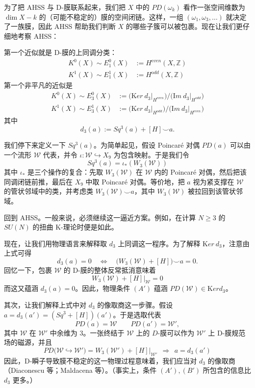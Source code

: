 \documentclass[11pt,a4paper]{ctexart}
\begin{document}
为了把 AHSS 与 D-膜联系起来，我们把 \(X\) 中的 \(PD(\omega_k)\) 看作一张空间维数为 \(\dim X - k\) 的（可能不稳定的）膜的空间闭链。这样，一组 \((\omega_1, \omega_3, \dots)\) 就决定了一族膜，因此 AHSS 帮助我们判断 \(X\) 的哪些子簇可以被包裹。现在让我们更仔细地考察 AHSS：

第一个近似就是 D-膜的上同调分类： \[\begin{matrix}
K^0(X) \sim   E^0_1(X) & :=   H^{\mathrm even}(X,\mathbb{Z}) \\
K^1(X) \sim  E^1_1(X) & :=  H^{ \mathrm odd}(X,\mathbb{Z})
\end{matrix}\] 第一个非平凡的近似是 \[\begin{matrix}
K^0(X) \sim E^0_3(X) &  := \bigl( {\mathrm Ker} ~d_3\vert_{H^{\mathrm even} }\bigr) / \bigl({\mathrm Im} ~d_3\vert_{H^{\mathrm odd}}\bigr)\\
K^1(X) \sim E^1_3(X)  & := \bigl( {\mathrm Ker} ~d_3\vert_{H^{\mathrm odd} }\bigr) / \bigl({\mathrm Im} ~d_3\vert_{H^{\mathrm even}}\bigr)
\end{matrix}\] 其中 \[d_3(a) := Sq^3(a) + [H]\smile a.\]

我们停下来定义一下 \(Sq^3(a)\)。为简单起见，假设 Poincaré 对偶 \(PD(a)\) 可以由一个流形 \({\mathcal W}\) 代表，并令 \(\iota: {\mathcal W} \hookrightarrow X_9\) 为包含映射。于是我们令 \[Sq^3(a) = \iota_*(W_3({\mathcal W}) )\] 其中 \(\iota_*\) 是三个操作的复合：先取 \(W_3({\mathcal W})\) 在 \({\mathcal W}\) 内的 Poincaré 对偶，然后把该同调闭链前推，最后在 \(X_9\) 中取 Poincaré 对偶。等价地，把 \(a\) 视为紧支撑在 \({\mathcal W}\) 的管状邻域中的类，并考虑类 \(W_3({\mathcal W}) \smile a\)，其中 \(W_3({\mathcal W})\) 被拉回到该管状邻域。

回到 AHSS。一般来说，必须继续这一逼近方案。例如，在计算 \(N\geq 3\) 的 \(SU(N)\) 的扭曲 K-理论时便是如此。

现在，让我们用物理语言来解释取 \(d_3\) 上同调这一程序。为了解释 \({\mathrm Ker }~ d_3\)，注意由上式可得 \[d_3(a)=0 \quad \Leftrightarrow \quad
\biggl( W_3({\mathcal W}) + [H] \biggr) \smile a = 0 .\] 回忆一下，包裹 \({\mathcal W}\) 的 D-膜的整体反常抵消意味着 \[W_3({\mathcal W}) + [H]\vert_{{\mathcal W}} =0\] 而这又蕴涵 \(d_3(a)=0\)。因此，物理条件 \((A')\) 蕴涵 \(PD({\mathcal W}) \in {\mathrm Ker} d_3\)。

其次，让我们解释上式中对 \(d_3\) 的像取商这一步骤。假设 \(a=d_3(a') = (Sq^3 + [H])(a')\)。于是选取代表 \[PD(a) = {\mathcal W} \qquad  PD(a') = {\mathcal W}' ,\] 其中 \({\mathcal W}\) 在 \({\mathcal W}'\) 中余维为 3。一张终结于 \({\mathcal W}\) 上的 \(D\)-膜可以作为 \({\mathcal W}'\) 上 D-膜规范场的磁源，并且 \[PD\bigl( {\mathcal W} \hookrightarrow {\mathcal W}' \bigr)
= W_3({\mathcal W}') + [H]\vert_{{\mathcal W}'} ~~ \Rightarrow ~~a = d_3(a')\] 因此，D-瞬子导致膜不稳定的这一物理过程意味着，我们应当对 \(d_3\) 的像取商（Diaconescu 等；Maldacena 等）。（事实上，条件 \((A'),(B')\) 所包含的信息比 \(d_3\) 更多。）
\end{document}
